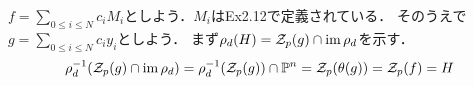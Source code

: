 \documentclass[a4paper]{jarticle}
\begin{document}
    $f=\sum_{0 \leq i \leq N}{c_i M_i}$としよう．$M_i$はEx2.12で定義されている．
    そのうえで$g=\sum_{0 \leq i \leq N}{c_i y_i}$としよう．
    まず$\rho_d(H)=\mathcal{Z}_p(g) \cap \operatorname{im} \rho_d$を示す．
    \[ \rho_d^{-1}(\mathcal{Z}_p(g) \cap \operatorname{im} \rho_d)=\rho_d^{-1}(\mathcal{Z}_p(g)) \cap \mathbb{P}^n=\mathcal{Z}_p(\theta(g))=\mathcal{Z}_p(f)=H \]


\section{} %

\section{} %

\section{} %

\section{} %
\end{document}

